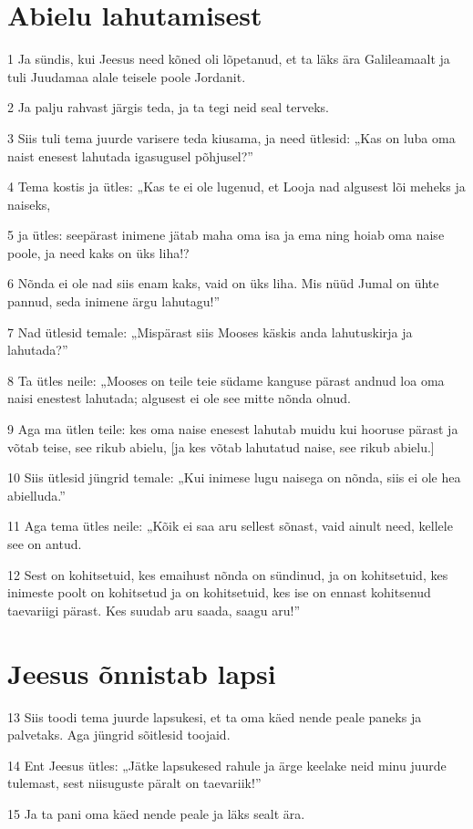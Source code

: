 \section*{Abielu lahutamisest}

\par 1 Ja sündis, kui Jeesus need kõned oli lõpetanud, et ta läks ära Galileamaalt ja tuli Juudamaa alale teisele poole Jordanit.
\par 2 Ja palju rahvast järgis teda, ja ta tegi neid seal terveks.
\par 3 Siis tuli tema juurde varisere teda kiusama, ja need ütlesid: „Kas on luba oma naist enesest lahutada igasugusel põhjusel?”
\par 4 Tema kostis ja ütles: „Kas te ei ole lugenud, et Looja nad algusest lõi meheks ja naiseks,
\par 5 ja ütles: seepärast inimene jätab maha oma isa ja ema ning hoiab oma naise poole, ja need kaks on üks liha!?
\par 6 Nõnda ei ole nad siis enam kaks, vaid on üks liha. Mis nüüd Jumal on ühte pannud, seda inimene ärgu lahutagu!”
\par 7 Nad ütlesid temale: „Mispärast siis Mooses käskis anda lahutuskirja ja lahutada?”
\par 8 Ta ütles neile: „Mooses on teile teie südame kanguse pärast andnud loa oma naisi enestest lahutada; algusest ei ole see mitte nõnda olnud.
\par 9 Aga ma ütlen teile: kes oma naise enesest lahutab muidu kui hooruse pärast ja võtab teise, see rikub abielu, [ja kes võtab lahutatud naise, see rikub abielu.]
\par 10 Siis ütlesid jüngrid temale: „Kui inimese lugu naisega on nõnda, siis ei ole hea abielluda.”
\par 11 Aga tema ütles neile: „Kõik ei saa aru sellest sõnast, vaid ainult need, kellele see on antud.
\par 12 Sest on kohitsetuid, kes emaihust nõnda on sündinud, ja on kohitsetuid, kes inimeste poolt on kohitsetud ja on kohitsetuid, kes ise on ennast kohitsenud taevariigi pärast. Kes suudab aru saada, saagu aru!”

\section*{Jeesus õnnistab lapsi}

\par 13 Siis toodi tema juurde lapsukesi, et ta oma käed nende peale paneks ja palvetaks. Aga jüngrid sõitlesid toojaid.
\par 14 Ent Jeesus ütles: „Jätke lapsukesed rahule ja ärge keelake neid minu juurde tulemast, sest niisuguste päralt on taevariik!”
\par 15 Ja ta pani oma käed nende peale ja läks sealt ära.

